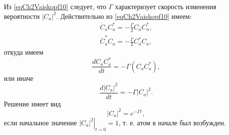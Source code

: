 Из \eqref{eqCh2Vaiskopf10} следует, что $\Gamma$ характеризует
скорость изменения вероятности $\left|C_{a}\right|^2$. Действительно
из \eqref{eqCh2Vaiskopf10} имеем:
\begin{eqnarray}
\dot{C}_{a}C_{a}^{*} = - \frac{\Gamma}{2}C_{a}C_{a}^{*},
\nonumber \\
\dot{C}_{a}^{*}C_{a} = - \frac{\Gamma}{2}C_{a}^{*}C_{a},
\nonumber
\end{eqnarray}
откуда имеем
\begin{equation}
\frac{d C_{a}C_{a}^{*}}{dt} = -\Gamma \left(C_{a}C_{a}^{*}\right),
\nonumber
\end{equation}
или иначе
\begin{equation}
\frac{d \left|C_{a}\right|^2}{dt} = -\Gamma \left|C_{a}\right|^2.
\nonumber
\end{equation}
Решение имеет вид 
\[
\left|C_{a}\right|^2 = e^{- \Gamma t},
\]
если начальное значение $\left.\left|C_{a}\right|^2\right|_{t = 0} =
1$, т. е. атом в начале был возбужден.



